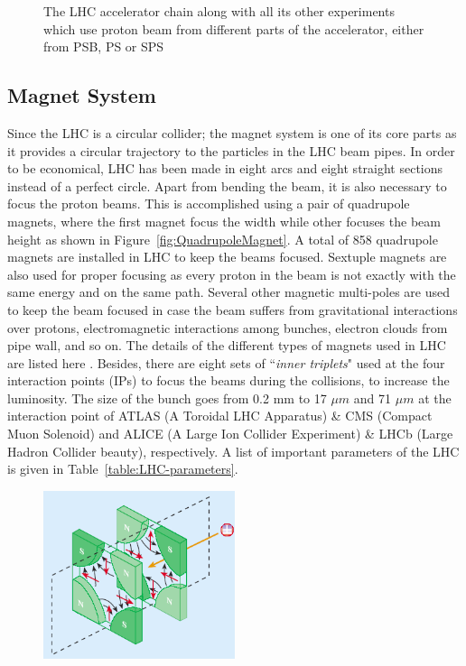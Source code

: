 {{{\begin{figure}[!htbp]
	\caption{The LHC accelerator chain along with all its other experiments which use proton beam from different parts of the accelerator, either from PSB, PS or SPS~\cite{Fig-CERN-accelerator-complex}}
	\label{fig:CERN-accelerator-complex}
\end{figure}
\subsection{Magnet System}
Since the LHC is a circular collider; the magnet system is one of its core parts as it provides a circular trajectory to the particles in the LHC beam pipes. In order to be economical, LHC has been made in eight arcs and eight straight sections instead of a perfect circle. Apart from bending the beam, it is also necessary to focus the proton beams. This is accomplished using a pair of quadrupole magnets, where the first magnet focus the width while other focuses the beam height as shown in Figure~\ref{fig:QuadrupoleMagnet}. A total of 858 quadrupole magnets are installed in LHC to keep the beams focused. Sextuple magnets are also used for proper focusing as every proton in the beam is not exactly with the same energy and on the same path. Several other magnetic multi-poles are used to keep the beam focused  in case the beam suffers from gravitational interactions over protons, electromagnetic interactions among bunches, electron clouds from pipe wall, and so on. The details of the different types of magnets used in LHC are listed here \cite{WebLink:LHC_magnets}. Besides, there are eight sets of  ``\textit{inner triplets}" used at the four interaction points (IPs) to focus the beams during the collisions, to increase the luminosity. The size of the bunch goes from 0.2 mm to 17 $\mu m$ and 71 $\mu m$ at the interaction point of ATLAS (A Toroidal LHC Apparatus) \& CMS (Compact Muon Solenoid) and ALICE (A Large Ion Collider Experiment) \& LHCb (Large Hadron Collider beauty), respectively. A list of important parameters of the LHC is given in Table~\ref{table:LHC-parameters}.
\begin{figure}[!htbp]
	\centering
	\includegraphics[width=0.50\textwidth]{figures/LHC/quadrupole_magnet_pair.png}

\end{figure}}}}
